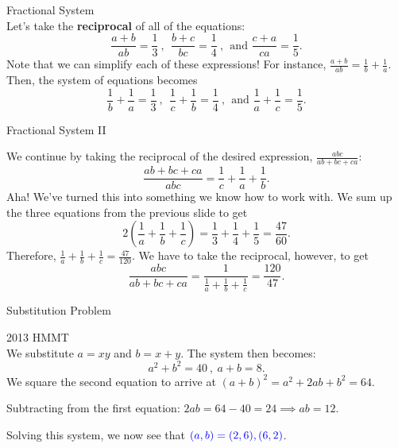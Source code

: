 \documentclass[xcolor=dvipsnames, fontsize=11pt, %
pagesize, %
parskip=half-, t]{beamer}
\begin{document}
\begin{frame}{Fractional System}
	 ~\\
Let's take the \textbf{reciprocal} of all of the equations: $$\frac{a+b}{ab}=\frac13\:,\:\: \frac{b+c}{bc}=\frac14\:,\:\: \text{and } \frac{c+a}{ca}=\frac15.$$ 
	Note that we can simplify each of these expressions! For instance, $\frac{a+b}{ab}=\frac{1}{b}+\frac{1}{a}$. Then, the system of equations becomes $$\frac{1}{b}+\frac{1}{a}=\frac13\:,\:\: \frac{1}{c}+\frac{1}{b}=\frac14\:,\:\: \text{and } \frac{1}{a}+\frac{1}{c}=\frac15.$$ 
\end{frame}

\begin{frame}{Fractional System II}
	
	We continue by taking the reciprocal of the desired expression, $\frac{abc}{ab+bc+ca}$: $$\frac{ab+bc+ca}{abc}=\frac{1}{c}+\frac{1}{a}+\frac{1}{b}.$$ Aha! We've turned this into something we know how to work with. We sum up the three equations from the previous slide to get $$2\left(\frac1a+\frac1b+\frac1c\right)=\frac13+\frac14+\frac15=\frac{47}{60}.$$ Therefore, $\displaystyle \frac1a+\frac1b+\frac1c=\frac{47}{120}$. We have to take the reciprocal, however, to get $$\frac{abc}{ab+bc+ca}=\frac{1}{\frac1a+\frac1b+\frac1c}=\boxed{\frac{120}{47}}.$$
	
\end{frame}
	



\begin{frame}[c]{Substitution Problem}
	\centering
\end{frame}

\begin{frame}{2013 HMMT}
		 ~\\

We substitute $a=xy$ and $b=x+y$. The system then becomes: $$a^2+b^2=40\:,\: a+b=8.$$  
	We square the second equation to arrive at $(a+b)^2=a^2+2ab+b^2=64$.  \medskip
	
	Subtracting from the first equation: $2ab=64-40=24\implies ab=12.$ \medskip
	
	Solving this system, we now see that $\color{blue} (a,b)=(2,6), (6,2)$.
\end{frame}
\end{document}
